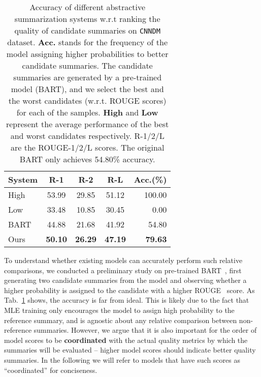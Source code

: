 \documentclass[11pt]{article}
\begin{document}
\begin{table}[t!]
 \setlength{\tabcolsep}{9pt}
\centering \small
\begin{tabular}{lcccr}
\toprule
\textbf{System} & \textbf{R-1} & \textbf{R-2} & \textbf{R-L} & \textbf{Acc.(\%)} \\
\midrule
 High & 53.99 & 29.85 & 51.12 & 100.00 \\
 Low & 33.48 & 10.85 & 30.45 & 0.00 \\
\midrule
 BART & 44.88 & 21.68 & 41.92 & 54.80 \\
 Ours & \textbf{50.10} & \textbf{26.29} & \textbf{47.19} & \textbf{79.63} \\
\bottomrule
\end{tabular}
\caption{\label{tab:intro} 
Accuracy of different abstractive summarization systems w.r.t ranking the quality of candidate summaries on \texttt{CNNDM} dataset.
\textbf{Acc.} stands for the frequency of the model assigning higher probabilities to better candidate summaries. 
The candidate summaries are generated by a pre-trained model (BART), and we select the best and the worst candidates (w.r.t. ROUGE scores) for each of the samples.
\textbf{High} and \textbf{Low} represent the average performance of the best and worst candidates respectively.
R-1/2/L are the ROUGE-1/2/L scores.
The original BART only achieves 54.80\% accuracy.
}
\end{table}


To understand whether existing models can accurately perform such relative comparisons, we conducted a preliminary study on pre-trained BART~\citep{lewis-etal-2020-bart}, first generating two candidate summaries from the model and observing whether a higher probability is assigned to the candidate with a higher ROUGE~\citep{lin-2004-rouge} score.
As Tab.~\ref{tab:intro} shows, the accuracy is far from ideal.
This is likely due to the fact that MLE training only encourages the model to assign high probability to the reference summary, and is agnostic about any relative comparison between non-reference summaries.
However, we argue that it is also important for the order of model scores to be \textbf{coordinated} with the actual quality metrics by which the summaries will be evaluated -- higher model scores should indicate better quality summaries. In the following we will refer to models that have such scores as ``coordinated'' for conciseness.
\end{document}
